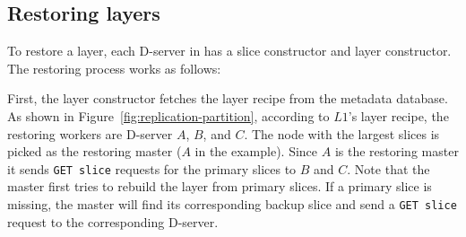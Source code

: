 \subsection{Restoring layers}
\label{sec:restore-desgin}





To restore a layer, each D-server in \sysname has a slice constructor and
layer constructor. The restoring process works as follows:

First, the layer constructor fetches the layer recipe from the metadata database.
As shown in Figure~\ref{fig:replication-partition}, according to $L1$'s layer recipe,  the restoring workers are D-server $A$, $B$, and $C$. The node with the largest slices is picked as the restoring master ($A$ in the example).
Since $A$ is the restoring master
it sends \texttt{GET slice} requests for the primary slices to $B$ and $C$.
Note that the master first tries to rebuild the layer from primary slices.
If a primary slice is missing, the master will find its corresponding backup
slice and send a \texttt{GET slice} request to the corresponding D-server.


